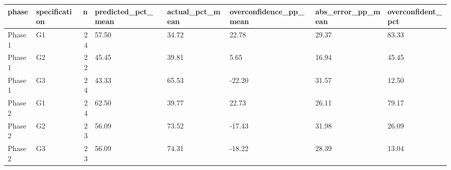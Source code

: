 \begin{tabular}{llrlllll}
\toprule
phase & specification & n & predicted_pct_mean & actual_pct_mean & overconfidence_pp_mean & abs_error_pp_mean & overconfident_pct \\
\midrule
Phase 1 & G1 & 24 & 57.50 & 34.72 & 22.78 & 29.37 & 83.33 \\
Phase 1 & G2 & 22 & 45.45 & 39.81 & 5.65 & 16.94 & 45.45 \\
Phase 1 & G3 & 24 & 43.33 & 65.53 & -22.20 & 31.57 & 12.50 \\
Phase 2 & G1 & 24 & 62.50 & 39.77 & 22.73 & 26.11 & 79.17 \\
Phase 2 & G2 & 23 & 56.09 & 73.52 & -17.43 & 31.98 & 26.09 \\
Phase 2 & G3 & 23 & 56.09 & 74.31 & -18.22 & 28.39 & 13.04 \\
\bottomrule
\end{tabular}
